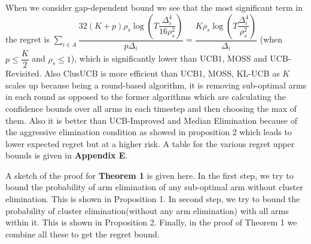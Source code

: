 \begin{remark}
	When we consider gap-dependent bound we see that the most significant term in the regret is $\sum_{i\in A}\dfrac{32(K+p)\rho_{s}\log{(T\dfrac{\Delta_{i}^{4}}{16\rho_{s}^{2}})}}{p\Delta_{i}}= \dfrac{K\rho_{s}\log{(T\dfrac{\Delta_{i}^{4}}{\rho_{s}^{2}})}}{\Delta_{i}}$ (when $p\leq \dfrac{K}{2}$ and $\rho_{s} \leq 1$), which is significantly lower than UCB1, MOSS and UCB-Revisited. Also ClusUCB is more efficient than UCB1, MOSS, KL-UCB as $K$ scales up because being a round-based algorithm, it is removing sub-optimal arms in each round as opposed to the former algorithms which are calculating the confidence bounds over all arms in each timestep and then choosing the max of them. Also it is better than UCB-Improved and Median Elimination because of the aggressive elimination condition as showed in proposition 2 which leads to lower expected regret but at a higher risk. A table for the various regret upper bounds is given in \textbf{Appendix E}. 
	
\end{remark}	



\begin{remark}
A sketch of the proof for \textbf{Theorem 1} is given here. In the first step, we try to bound the probability of arm elimination of any sub-optimal arm without cluster elimination. This is shown in Proposition 1. In second step, we try to bound the probability of cluster elimination(without any arm elimination) with all arms within it. This is shown in Proposition 2. Finally, in the proof of Theorem 1 we combine all these to get the regret bound.  
\end{remark}
	
